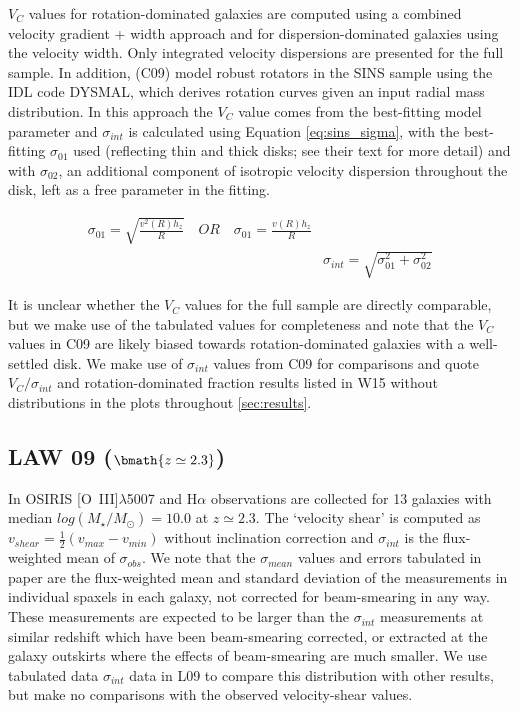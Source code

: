 \documentclass[fleqn,usenatbib]{mn2e}
\begin{document}
$V_{C}$ values for rotation-dominated galaxies are computed using a combined velocity gradient + width approach \citep{ForsterSchreiber2006} and for dispersion-dominated galaxies using the velocity width.
Only integrated velocity dispersions are presented for the full sample.
In addition, \cite{Cresci2009} (C09) model robust rotators in the SINS sample using the IDL code DYSMAL, which derives rotation curves given an input radial mass distribution.
In this approach the $V_{C}$ value comes from the best-fitting model parameter and $\sigma_{int}$ is calculated using Equation \ref{eq:sins_sigma}, with the best-fitting $\sigma_{01}$ used (reflecting thin and thick disks; see their text for more detail) and with $\sigma_{02}$, an additional component of isotropic velocity dispersion throughout the disk, left as a free parameter in the fitting.

\begin{equation}\label{eq:sins_sigma}
\begin{split}
\sigma_{01} = \sqrt{\frac{v^{2}(R)h_{z}}{R}} \quad OR \quad \sigma_{01} = \frac{v(R)h_{z}}{R} \\
& \sigma_{int} = \sqrt{\sigma_{01}^{2} + \sigma_{02}^{2}}
\end{split}
\end{equation}

It is unclear whether the $V_{C}$ values for the full sample are directly comparable, but we make use of the tabulated values for completeness and note that the $V_{C}$ values in C09 are likely biased towards rotation-dominated galaxies with a well-settled disk.
We make use of $\sigma_{int}$ values from C09 for comparisons and quote $V_{C}/\sigma_{int}$ and rotation-dominated fraction results listed in W15 without distributions in the plots throughout \cref{sec:results}.

\subsection{LAW 09 ($\bmath{z\simeq2.3}$)}\label{subsec:law_09}
In \cite[L09]{Law2009} OSIRIS [O~{\sc III}]$\lambda$5007 and H$\alpha$ observations are collected for 13 galaxies with median $log(M_{\star}/M_{\odot})=10.0$ at $z\simeq2.3$.
The `velocity shear' is computed as $v_{shear} = \frac{1}{2}(v_{max} - v_{min})$ without inclination correction and $\sigma_{int}$ is the flux-weighted mean of $\sigma_{obs}$.
We note that the $\sigma_{mean}$ values and errors tabulated in \cite{Law2009} paper are the flux-weighted mean and standard deviation of the measurements in individual spaxels in each galaxy, not corrected for beam-smearing in any way.
These measurements are expected to be larger than the $\sigma_{int}$ measurements at similar redshift which have been beam-smearing corrected, or extracted at the galaxy outskirts where the effects of beam-smearing are much smaller.
We use tabulated data $\sigma_{int}$ data in L09 to compare this distribution with other results, but make no comparisons with the observed velocity-shear values.
\end{document}
